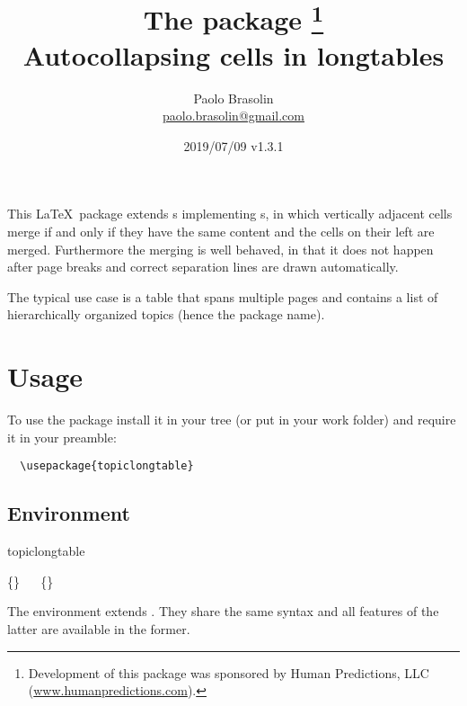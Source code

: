\documentclass[full,kernel]{l3doc}
\begin{document}
\title{%
  The  package%
  \thanks{Development of this package was sponsored by Human Predictions,
    LLC (\href{http://www.humanpredictions.com}{www.humanpredictions.com}).}\\
  Autocollapsing cells in longtables
}

\author{
  Paolo Brasolin\\
  \href{mailto:paolo.brasolin@gmail.com}{paolo.brasolin@gmail.com}
}

\date{2019/07/09 v1.3.1}

\maketitle

\begin{documentation}


This \LaTeX\ package extends s implementing
s, in which vertically adjacent cells merge if
and only if they have the same content and the cells on their left
are merged.  Furthermore the merging is well behaved, in that it
does not happen after page breaks and correct separation lines are
drawn automatically.

The typical use case is a table that spans multiple pages and
contains a list of hierarchically organized topics (hence the package
name).




\section*{Usage}

To use the package install it in your tree (or put  in your work folder) and require it in your preamble:

\begin{verbatim}
  \usepackage{topiclongtable}
\end{verbatim}




\subsection*{Environment}

\begin{function}[updated=2019-07-08]{topiclongtable}
  \begin{syntax}
    \{\}
    \ \ 
    \{\}
  \end{syntax}
  The  environment extends .
  They share the same syntax and all features of the latter are
  available in the former.


\end{function}
\end{documentation}
\end{document}
